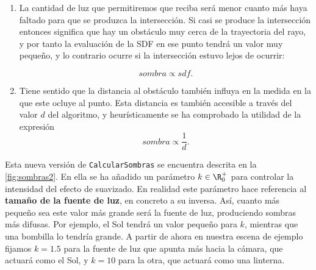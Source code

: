 \begin{enumerate}
    
    \item La cantidad de luz que permitiremos que reciba será menor cuanto más haya faltado para que se produzca la intersección. Si casi se produce la intersección entonces significa que hay un obstáculo muy cerca de la trayectoria del rayo, y por tanto la evaluación de la SDF en ese punto tendrá un valor muy pequeño, y lo contrario ocurre si la intersección estuvo lejos de ocurrir:
    
    \begin{equation*}
        sombra \propto sdf.
    \end{equation*}
    \item Tiene sentido que la distancia al obstáculo también influya en la medida en la que este ocluye al punto. Esta distancia es también accesible a través del valor $d$ del algoritmo, y heurísticamente se ha comprobado la utilidad de la expresión
    \begin{equation*}
        sombra \propto \frac{1}{d}.
    \end{equation*}
\end{enumerate}

Esta nueva versión de \texttt{CalcularSombras} se encuentra descrita en la \autoref{fig:sombras2}. En ella se ha añadido un parámetro $k\in \R_0^+$ para controlar la intensidad del efecto de suavizado. En realidad este parámetro hace referencia al \textbf{tamaño de la fuente de luz}, en concreto a su inversa. Así, cuanto más pequeño sea este valor más grande será la fuente de luz, produciendo sombras más difusas. Por ejemplo, el Sol tendrá un valor pequeño para $k$, mientras que una bombilla lo tendría grande. A partir de ahora en nuestra escena de ejemplo fijamos $k=  1.5$ para la fuente de luz que apunta más hacia la cámara, que actuará como el Sol, y $k = 10$ para la otra, que actuará como una linterna.\newline

